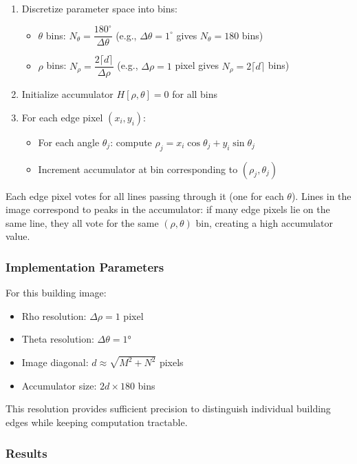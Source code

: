 \documentclass[11pt,a4paper]{article}
\begin{document}
\begin{enumerate}
    \item Discretize parameter space into bins:
    \begin{itemize}
        \item $\theta$ bins: \(
            N_\theta = \dfrac{180^\circ}{\Delta\theta}
        \) (e.g., $\Delta\theta=1^\circ$ gives $N_\theta=180$ bins)
        \item $\rho$ bins: \(
            N_\rho = \dfrac{2\lceil d\rceil}{\Delta\rho}
        \) (e.g., $\Delta\rho=1$ pixel gives $N_\rho=2\lceil d\rceil$ bins)
    \end{itemize}
    \item Initialize accumulator $H[\rho, \theta] = 0$ for all bins
    \item For each edge pixel $(x_i, y_i)$:
    \begin{itemize}
        \item For each angle $\theta_j$: compute $\rho_j = x_i\cos\theta_j + y_i\sin\theta_j$
        \item Increment accumulator at bin corresponding to $(\rho_j, \theta_j)$
    \end{itemize}
\end{enumerate}

Each edge pixel votes for all lines passing through it (one for each $\theta$). Lines in the image correspond to peaks in the accumulator: if many edge pixels lie on the same line, they all vote for the same $(\rho, \theta)$ bin, creating a high accumulator value.

\subsubsection{Implementation Parameters}
For this building image:
\begin{itemize}
    \item Rho resolution: $\Delta\rho = 1$ pixel
    \item Theta resolution: $\Delta\theta = 1°$
    \item Image diagonal: $d \approx \sqrt{M^2 + N^2}$ pixels
    \item Accumulator size: $2d \times 180$ bins
\end{itemize}

This resolution provides sufficient precision to distinguish individual building edges while keeping computation tractable.

\subsubsection{Results}
\end{document}
